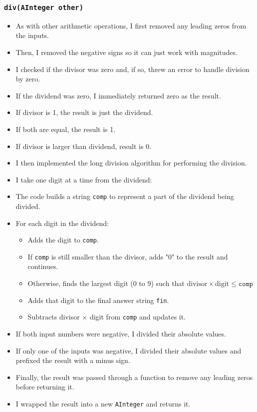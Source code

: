 \documentclass{article}
\begin{document}
\subsubsection*{\texttt{div(AInteger other)}}
\begin{itemize}
    \item As with other arithmetic operations, I first removed any leading zeros from the inputs.
    \item Then, I removed the negative signs so it can just work with magnitudes.
    \item I checked if the divisor was zero and, if so, threw an error to handle division by zero.
    \item If the dividend was zero, I immediately returned zero as the result.
    \item If divisor is 1, the result is just the dividend.
    \item If both are equal, the result is 1.
    \item If divisor is larger than dividend, result is 0.
    \item I then implemented the long division algorithm for performing the division.
    \item I take one digit at a time from the dividend:
    \item The code builds a string \texttt{comp} to represent a part of the dividend being divided.
    \item For each digit in the dividend:
        \begin{itemize}
            \item Adds the digit to \texttt{comp}.
            \item If \texttt{comp} is still smaller than the divisor, adds "0" to the result and continues.
            \item Otherwise, finds the largest digit (0 to 9) such that $ \text{divisor} \times \text{digit} \leq \texttt{comp} $
            \item Adds that digit to the final answer string \texttt{fin}.
            \item Subtracts divisor $\times$ digit from \texttt{comp} and updates it.
        \end{itemize}
    \item If both input numbers were negative, I divided their absolute values.
    \item If only one of the inputs was negative, I divided their absolute values and prefixed the result with a minus sign.
    \item Finally, the result was passed through a function to remove any leading zeros before returning it.
    \item I wrapped the result into a new \texttt{AInteger} and returns it.
\end{itemize}
\end{document}
